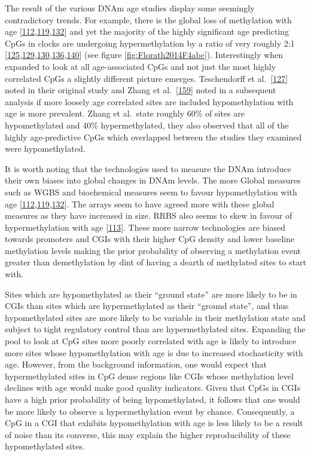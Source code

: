 \documentclass[
]{book}
\begin{document}
The result of the various DNAm age studies display some seemingly contradictory trends.
For example, there is the global loss of methylation with age {[}\protect\hyperlink{ref-Wilson1987}{112},\protect\hyperlink{ref-Fraga2005}{119},\protect\hyperlink{ref-Heyn2012}{132}{]} and yet the majority of the highly significant age predicting CpGs in clocks are undergoing hypermethylation by a ratio of very roughly 2:1 {[}\protect\hyperlink{ref-Rakyan2010}{125},\protect\hyperlink{ref-Bocklandt2011}{129},\protect\hyperlink{ref-Koch2011}{130},\protect\hyperlink{ref-Garagnani2012}{136},\protect\hyperlink{ref-Florath2014}{140}{]} (see figure \ref{fig:Florath2014F4abc}).
Interestingly when expanded to look at all age-associated CpGs and not just the most highly correlated CpGs a slightly different picture emerges. Teschendorff et al.~{[}\protect\hyperlink{ref-Teschendorff2010}{127}{]} noted in their original study and Zhang et al.~{[}\protect\hyperlink{ref-Zhang2017}{159}{]} noted in a subsequent analysis if more loosely age correlated sites are included hypomethylation with age is more prevalent.
Zhang et al.~state roughly 60\% of sites are hypomethylated and 40\% hypermethylated, they also observed that all of the highly age-predictive CpGs which overlapped between the studies they examined were hypomethylated.

It is worth noting that the technologies used to measure the DNAm introduce their own biases into global changes in DNAm levels.
The more Global measures such as WGBS and biochemical measures seem to favour hypomethylation with age {[}\protect\hyperlink{ref-Wilson1987}{112},\protect\hyperlink{ref-Fraga2005}{119},\protect\hyperlink{ref-Heyn2012}{132}{]}.
The arrays seem to have agreed more with these global measures as they have increased in size.
RRBS also seems to skew in favour of hypermethylation with age {[}\protect\hyperlink{ref-Cole2017}{113}{]}.
These more narrow technologies are biased towards promoters and CGIs with their higher CpG density and lower baseline methylation levels making the prior probability of observing a methylation event greater than demethylation by dint of having a dearth of methylated sites to start with.

Sites which are hypomethylated as their ``ground state'' are more likely to be in CGIs than sites which are hypermethylated as their ``ground state'', and thus hypomethylated sites are more likely to be variable in their methylation state and subject to tight regulatory control than are hypermethylated sites.
Expanding the pool to look at CpG sites more poorly correlated with age is likely to introduce more sites whose hypomethylation with age is due to increased stochasticity with age.
However, from the background information, one would expect that hypermethylated sites in CpG dense regions like CGIs whose methylation level declines with age would make good quality indicators.
Given that CpGs in CGIs have a high prior probability of being hypomethylated, it follows that one would be more likely to observe a hypermethylation event by chance.
Consequently, a CpG in a CGI that exhibits hypomethylation with age is less likely to be a result of noise than its converse, this may explain the higher reproducibility of these hypomethylated sites.
\end{document}
